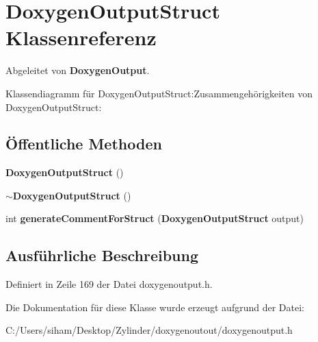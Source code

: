 \section{Doxygen\-Output\-Struct Klassenreferenz}
\label{class_doxygen_output_struct}
Abgeleitet von {\bf Doxygen\-Output}.

Klassendiagramm f\"{u}r Doxygen\-Output\-Struct:Zusammengeh\"{o}rigkeiten von Doxygen\-Output\-Struct:\subsection*{\"{O}ffentliche Methoden}
\begin{CompactItemize}
\item 
{\bf Doxygen\-Output\-Struct} ()\label{class_doxygen_output_struct_f5ec8f156b24f2a6deae5a8cb2e33179}

\item 
{\bf $\sim$Doxygen\-Output\-Struct} ()\label{class_doxygen_output_struct_5440c955b68400c56084cbdd02b219d5}

\item 
int {\bf generate\-Comment\-For\-Struct} ({\bf Doxygen\-Output\-Struct} output)\label{class_doxygen_output_struct_8e4f6dcab5ffb3a722e1337456f7d4e6}

\end{CompactItemize}


\subsection{Ausf\"{u}hrliche Beschreibung}




Definiert in Zeile 169 der Datei doxygenoutput.h.

Die Dokumentation f\"{u}r diese Klasse wurde erzeugt aufgrund der Datei:\begin{CompactItemize}
\item 
C:/Users/siham/Desktop/Zylinder/doxygenoutout/doxygenoutput.h\end{CompactItemize}
